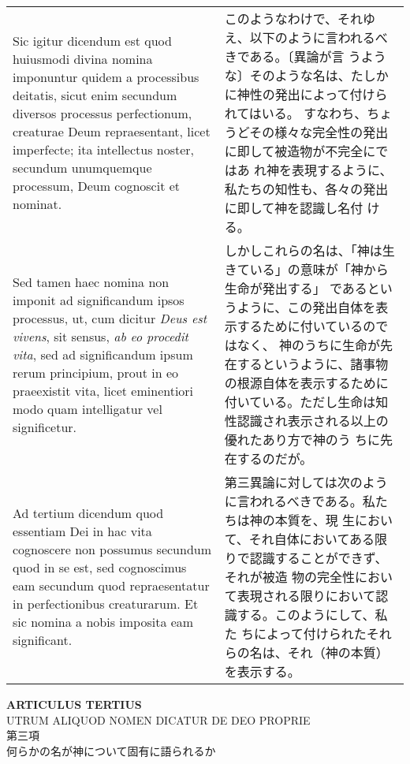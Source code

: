 \documentclass[10pt]{jsarticle} %
\begin{document}
\begin{longtable}{p{21em}p{21em}}
\\

Sic igitur dicendum est quod huiusmodi divina nomina imponuntur quidem
a processibus deitatis, sicut enim secundum diversos processus
perfectionum, creaturae Deum repraesentant, licet imperfecte; ita
intellectus noster, secundum unumquemque processum, Deum cognoscit et
nominat.

&

このようなわけで、それゆえ、以下のように言われるべきである。〔異論が言
うような〕そのような名は、たしかに神性の発出によって付けられてはいる。
すなわち、ちょうどその様々な完全性の発出に即して被造物が不完全にではあ
れ神を表現するように、私たちの知性も、各々の発出に即して神を認識し名付
ける。

\\

Sed tamen haec nomina non imponit ad significandum ipsos
processus, ut, cum dicitur {\it Deus est vivens}, sit sensus, {\it ab
eo procedit vita}, sed ad significandum ipsum rerum principium, prout
in eo praeexistit vita, licet eminentiori modo quam intelligatur vel
significetur.

&

しかしこれらの名は、「神は生きている」の意味が「神から生命が発出する」
であるというように、この発出自体を表示するために付いているのではなく、
神のうちに生命が先在するというように、諸事物の根源自体を表示するために
付いている。ただし生命は知性認識され表示される以上の優れたあり方で神のう
ちに先在するのだが。

\\

{\sc Ad tertium dicendum} quod essentiam Dei in hac vita cognoscere
non possumus secundum quod in se est, sed cognoscimus eam secundum
quod repraesentatur in perfectionibus creaturarum. Et sic nomina a
nobis imposita eam significant.

&

第三異論に対しては次のように言われるべきである。私たちは神の本質を、現
生において、それ自体においてある限りで認識することができず、それが被造
物の完全性において表現される限りにおいて認識する。このようにして、私た
ちによって付けられたそれらの名は、それ（神の本質）を表示する。

\end{longtable}

\newpage
{}

\begin{center}
{\Large {\bf ARTICULUS TERTIUS}}\\
{\large UTRUM ALIQUOD NOMEN DICATUR DE DEO PROPRIE}\\
{\large 第三項\\何らかの名が神について固有に語られるか} 
\end{center}
\end{document}
